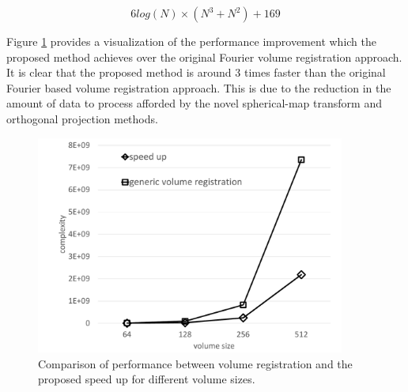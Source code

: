 \begin{equation} \label{eqn:FULLPERF2}
6log(N)\times (N^3 + N^2) + 169
\end{equation}

Figure \ref{fig:perfComp} provides a visualization of the performance improvement which the proposed method achieves over the original Fourier volume registration approach. It is clear that the proposed method is around 3 times faster
than the original Fourier based volume registration approach. This is due to the reduction in the amount of data to process afforded by the novel spherical-map transform and orthogonal projection methods.

\begin{figure}[!htb]
\centering
\includegraphics[width=4.0in]{images/ch2/perfcomp}
\caption{Comparison of performance between volume registration and the proposed speed up for different volume sizes.}
\label{fig:perfComp}
\end{figure}
